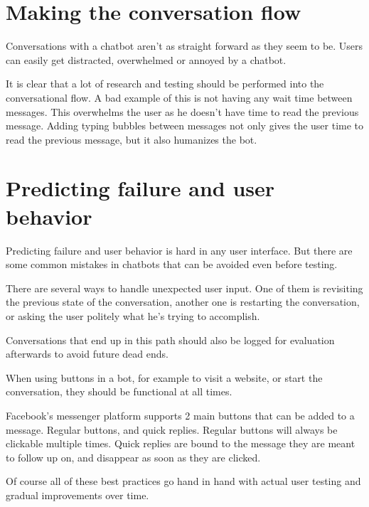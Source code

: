 \section{Making the conversation flow}

Conversations with a chatbot aren't as straight forward as they seem to be. Users can easily get distracted, overwhelmed or annoyed by a chatbot.

It is clear that a lot of research and testing should be performed into the conversational flow. A bad example of this is not having any wait time between messages. This overwhelms the user as he doesn't have time to read the previous message. Adding typing bubbles between messages not only gives the user time to read the previous message, but it also humanizes the bot.

\section{Predicting failure and user behavior}

Predicting failure and user behavior is hard in any user interface. But there are some common mistakes in chatbots that can be avoided even before testing.

There are several ways to handle unexpected user input.
One of them is revisiting the previous state of the conversation, another one is restarting the conversation, or asking the user politely what he's trying to accomplish.

Conversations that end up in this path should also be logged for evaluation afterwards to avoid future dead ends.

When using buttons in a bot, for example to visit a website, or start the conversation, they should be functional at all times.

Facebook's messenger platform supports 2 main buttons that can be added to a message. Regular buttons, and quick replies. Regular buttons will always be clickable multiple times. Quick replies are bound to the message they are meant to follow up on, and disappear as soon as they are clicked.

Of course all of these best practices go hand in hand with actual user testing and gradual improvements over time.